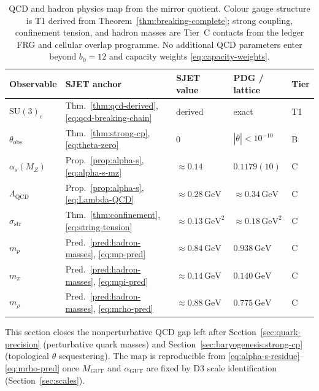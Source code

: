 \begin{table}[ht]
\centering
\small
\renewcommand{\arraystretch}{1.14}
\begin{tabular}{@{}lllll@{}}
\toprule
\textbf{Observable} & \textbf{SJET anchor} & \textbf{SJET value} &
\textbf{PDG / lattice} & \textbf{Tier} \\
\midrule
$\mathrm{SU}(3)_c$ &
  Thm.~\ref{thm:qcd-derived}, \eqref{eq:qcd-breaking-chain} &
  derived &
  exact &
  T1 \\
$\theta_{\mathrm{obs}}$ &
  Thm.~\ref{thm:strong-cp}, \eqref{eq:theta-zero} &
  $0$ &
  $|\bar\theta|<10^{-10}$ &
  B \\
$\alpha_s(M_Z)$ &
  Prop.~\ref{prop:alpha-s}, \eqref{eq:alpha-s-mz} &
  $\approx 0.14$ &
  $0.1179(10)$ &
  C \\
$\Lambda_{\mathrm{QCD}}$ &
  Prop.~\ref{prop:alpha-s}, \eqref{eq:Lambda-QCD} &
  $\approx 0.28\,\mathrm{GeV}$ &
  $\approx 0.34\,\mathrm{GeV}$ &
  C \\
$\sigma_{\mathrm{str}}$ &
  Thm.~\ref{thm:confinement}, \eqref{eq:string-tension} &
  $\approx 0.13\,\mathrm{GeV}^2$ &
  $\approx 0.18\,\mathrm{GeV}^2$ &
  C \\
$m_p$ &
  Pred.~\ref{pred:hadron-masses}, \eqref{eq:mp-pred} &
  $\approx 0.84\,\mathrm{GeV}$ &
  $0.938\,\mathrm{GeV}$ &
  C \\
$m_\pi$ &
  Pred.~\ref{pred:hadron-masses}, \eqref{eq:mpi-pred} &
  $\approx 0.14\,\mathrm{GeV}$ &
  $0.140\,\mathrm{GeV}$ &
  C \\
$m_\rho$ &
  Pred.~\ref{pred:hadron-masses}, \eqref{eq:mrho-pred} &
  $\approx 0.88\,\mathrm{GeV}$ &
  $0.775\,\mathrm{GeV}$ &
  C \\
\bottomrule
\end{tabular}
\caption{QCD and hadron physics map from the mirror quotient. Colour gauge
structure is T1 derived from Theorem~\ref{thm:breaking-complete}; strong
coupling, confinement tension, and hadron masses are Tier~C contacts from
the ledger FRG and cellular overlap programme. No additional QCD parameters
enter beyond $b_0=12$ and capacity weights
\eqref{eq:capacity-weights}.}
\label{tab:qcd-map}
\end{table}

\begin{remark}
This section closes the nonperturbative QCD gap left after
Section~\ref{sec:quark-precision} (perturbative quark masses) and
Section~\ref{sec:baryogenesis:strong-cp} (topological $\theta$ sequestering).
The map is reproducible from \eqref{eq:alpha-s-residue}--\eqref{eq:mrho-pred}
once $M_{\mathrm{GUT}}$ and $\alpha_{\mathrm{GUT}}$ are fixed by D3 scale
identification (Section~\ref{sec:scales}).
\end{remark}